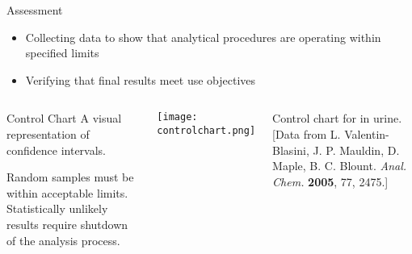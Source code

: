 \documentclass[notes=show]{beamer}
\begin{document}
\begin{frame}{Assessment}
	\begin{itemize}
		\item Collecting data to show that analytical procedures are
			operating \alert{within specified limits}
		\item Verifying that final results meet use objectives
	\end{itemize}

	\begin{columns}
		\begin{block}{Control Chart}
			A visual representation of confidence intervals.
			
			\vspace{1em}

			Random samples must be within acceptable limits.
			Statistically unlikely results require shutdown of the
			analysis process.
		\end{block}
		\tiny
		\begin{center}
			\texttt{[image: controlchart.png]}
		\end{center}

		Control chart for  in urine. [Data from L.
		Valentin-Blasini, J. P. Mauldin, D. Maple, B. C. Blount.
		\textit{Anal. Chem.} \textbf{2005}, 77, 2475.]
	\end{columns}
\end{frame}



\end{document}

